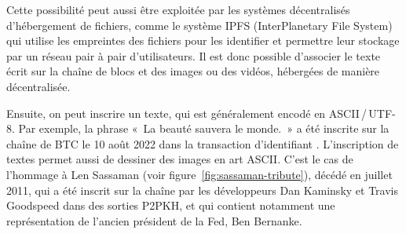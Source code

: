 Cette possibilité peut aussi être exploitée par les systèmes décentralisés d'hébergement de fichiers, comme le système IPFS (InterPlanetary File System) qui utilise les empreintes des fichiers pour les identifier et permettre leur stockage par un réseau pair à pair d'utilisateurs. Il est donc possible d'associer le texte écrit sur la chaîne de blocs et des images ou des vidéos, hébergées de manière décentralisée.

Ensuite, on peut inscrire un texte, qui est généralement encodé en ASCII\,/\,UTF-8. Par exemple, la phrase «~La beauté sauvera le monde.~» a été inscrite sur la chaîne de BTC le 10 août 2022 dans la transaction d'identifiant . L'inscription de textes permet aussi de dessiner des images en art ASCII. C'est le cas de l'hommage à Len Sassaman (voir figure~\ref{fig:sassaman-tribute}), décédé en juillet 2011, qui a été inscrit sur la chaîne par les développeurs Dan Kaminsky et Travis Goodspeed dans des sorties P2PKH, et qui contient notamment une représentation de l'ancien président de la Fed, Ben Bernanke.


